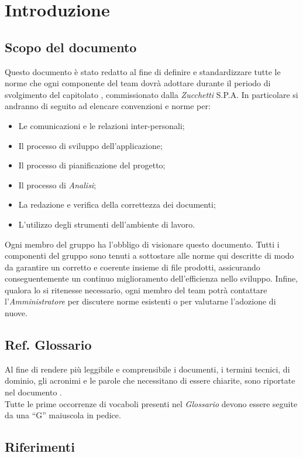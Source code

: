 \section{Introduzione}

\subsection{Scopo del documento}
Questo documento è stato redatto al fine di definire e standardizzare tutte le norme che ogni componente del team \gruppo{} dovrà adottare durante il periodo di svolgimento del capitolato \progetto, commissionato dalla \textit{Zucchetti} S.P.A. In particolare si andranno di seguito ad elencare convenzioni e norme per:
\begin{itemize}
\item Le comunicazioni e le relazioni inter-personali;
\item Il processo di sviluppo dell'applicazione;
\item Il processo di pianificazione del progetto;
\item Il processo di \textit{Analisi};
\item La redazione e verifica della correttezza dei documenti;
\item L'utilizzo degli strumenti dell'ambiente di lavoro.
\end{itemize}

Ogni membro del gruppo \gruppo{} ha l'obbligo di visionare questo documento.
Tutti i componenti del gruppo sono tenuti a sottostare alle norme qui descritte di modo da garantire un corretto e coerente insieme di file prodotti, assicurando conseguentemente un continuo miglioramento dell'efficienza nello sviluppo.
Infine, qualora lo si ritenesse necessario, ogni membro del team potrà contattare l'\textit{Amministratore} per discutere norme esistenti o per valutarne l'adozione di nuove.

\subsection{Ref. Glossario}
Al fine di rendere più leggibile e comprensibile i documenti, i termini tecnici, di dominio, gli acronimi e le parole che necessitano di essere chiarite, sono riportate nel documento \Glossario{}.\\
Tutte le prime occorrenze di vocaboli presenti nel \textit{Glossario} devono essere seguite da una ``G'' maiuscola in pedice.

\subsection{Riferimenti}

